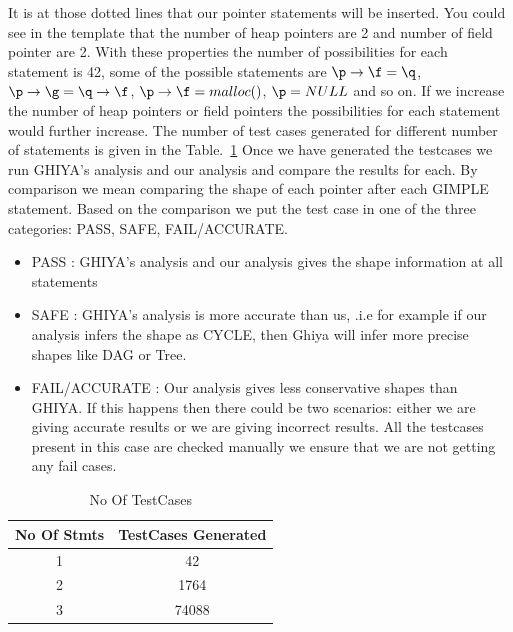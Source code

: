 It is at those dotted lines that our pointer statements will be inserted. You could see in the template that the number of heap pointers are 2 and 
number of field pointer are 2.
With these properties the number of possibilities for each statement is 42, some of the possible statements are $\p \rightarrow \f =  \q$,$\p \rightarrow \g =  \q \rightarrow \f$, $\p \rightarrow \f = malloc() $, $\p = NULL$ and so on. If we increase the number of heap pointers or field pointers the 
possibilities for each statement would further increase.
The number of test cases generated for different number of statements is given in the Table.~\ref{TestCaseCount}
Once we have generated the testcases we run GHIYA's analysis and our analysis and compare the results for each. By comparison we mean comparing the shape 
of each pointer
after each GIMPLE statement.
Based on the comparison we put the test case in one of the three categories: PASS, SAFE, FAIL/ACCURATE. \\

\begin{itemize}
 \item PASS : GHIYA's analysis and our analysis gives the shape information at all statements
 \item SAFE : GHIYA's analysis is more accurate than us, .i.e for example if our analysis infers the shape as CYCLE, then Ghiya will
 infer more precise shapes like DAG or Tree.
 \item FAIL/ACCURATE : Our analysis gives less conservative shapes than GHIYA. If this happens then there could be two scenarios: 
 either we are giving accurate results or we are giving incorrect results. 
 All the testcases present in this case  are checked manually we ensure that we are not getting any fail cases.
\end{itemize}

\begin{table}
 \begin{center}
\begin{tabular}{|c|c|}
 \hline
 {\bf No Of Stmts} & {\bf TestCases Generated} \\ \hline
  1  & 42 \\ \hline
  2  & 1764 \\ \hline
  3  & 74088 \\ \hline 
\end{tabular}
\end{center}
\label{TestCaseCount}
\caption{No Of TestCases} 
\end{table}

